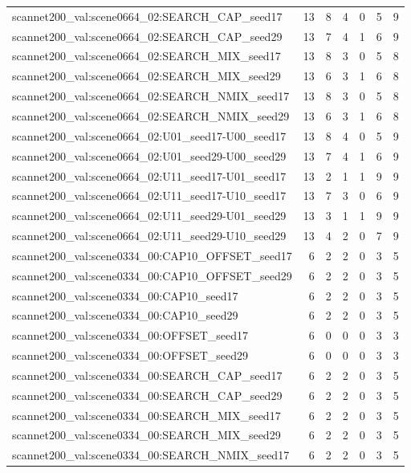 \begin{table}[t]
\begin{tabular}{lrrrrrr}
scannet200\_val:scene0664\_02:SEARCH\_CAP\_seed17 & 13 & 8 & 4 & 0 & 5 & 9 \\
scannet200\_val:scene0664\_02:SEARCH\_CAP\_seed29 & 13 & 7 & 4 & 1 & 6 & 9 \\
scannet200\_val:scene0664\_02:SEARCH\_MIX\_seed17 & 13 & 8 & 3 & 0 & 5 & 8 \\
scannet200\_val:scene0664\_02:SEARCH\_MIX\_seed29 & 13 & 6 & 3 & 1 & 6 & 8 \\
scannet200\_val:scene0664\_02:SEARCH\_NMIX\_seed17 & 13 & 8 & 3 & 0 & 5 & 8 \\
scannet200\_val:scene0664\_02:SEARCH\_NMIX\_seed29 & 13 & 6 & 3 & 1 & 6 & 8 \\
scannet200\_val:scene0664\_02:U01\_seed17-U00\_seed17 & 13 & 8 & 4 & 0 & 5 & 9 \\
scannet200\_val:scene0664\_02:U01\_seed29-U00\_seed29 & 13 & 7 & 4 & 1 & 6 & 9 \\
scannet200\_val:scene0664\_02:U11\_seed17-U01\_seed17 & 13 & 2 & 1 & 1 & 9 & 9 \\
scannet200\_val:scene0664\_02:U11\_seed17-U10\_seed17 & 13 & 7 & 3 & 0 & 6 & 9 \\
scannet200\_val:scene0664\_02:U11\_seed29-U01\_seed29 & 13 & 3 & 1 & 1 & 9 & 9 \\
scannet200\_val:scene0664\_02:U11\_seed29-U10\_seed29 & 13 & 4 & 2 & 0 & 7 & 9 \\
scannet200\_val:scene0334\_00:CAP10\_OFFSET\_seed17 & 6 & 2 & 2 & 0 & 3 & 5 \\
scannet200\_val:scene0334\_00:CAP10\_OFFSET\_seed29 & 6 & 2 & 2 & 0 & 3 & 5 \\
scannet200\_val:scene0334\_00:CAP10\_seed17 & 6 & 2 & 2 & 0 & 3 & 5 \\
scannet200\_val:scene0334\_00:CAP10\_seed29 & 6 & 2 & 2 & 0 & 3 & 5 \\
scannet200\_val:scene0334\_00:OFFSET\_seed17 & 6 & 0 & 0 & 0 & 3 & 3 \\
scannet200\_val:scene0334\_00:OFFSET\_seed29 & 6 & 0 & 0 & 0 & 3 & 3 \\
scannet200\_val:scene0334\_00:SEARCH\_CAP\_seed17 & 6 & 2 & 2 & 0 & 3 & 5 \\
scannet200\_val:scene0334\_00:SEARCH\_CAP\_seed29 & 6 & 2 & 2 & 0 & 3 & 5 \\
scannet200\_val:scene0334\_00:SEARCH\_MIX\_seed17 & 6 & 2 & 2 & 0 & 3 & 5 \\
scannet200\_val:scene0334\_00:SEARCH\_MIX\_seed29 & 6 & 2 & 2 & 0 & 3 & 5 \\
scannet200\_val:scene0334\_00:SEARCH\_NMIX\_seed17 & 6 & 2 & 2 & 0 & 3 & 5 \\

\end{tabular}
\end{table}
